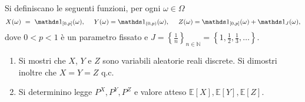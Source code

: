 Si definiscano le seguenti funzioni, per ogni $\omega \in \Omega $
\begin{equation*}
X( \omega ) \ =\ \Ind_{[ 0,p]}( \omega ) ,\ \ \ \ Y( \omega ) =\Ind_{( 0,p)}( \omega ) ,\ \ \ \ Z( \omega ) =\Ind_{[ 0,p]}( \omega ) +\Ind_{J}( \omega ) ,
\end{equation*}
dove $0< p< 1$ è un parametro fissato e $J=\left\{\frac{1}{n}\right\}_{n\in \mathbb{N}} =\left\{1,\frac{1}{2} ,\frac{1}{3} ,\dotsc \right\}$.
\begin{enumerate}
\item Si mostri che $X$, $Y$ e $Z$ sono variabili aleatorie reali discrete. Si dimostri inoltre che $X=Y=Z$ q.c.
\item Si determinino legge $P^{X} ,P^{Y} ,P^{Z}$ e valore atteso $\mathbb{E}[ X] ,\mathbb{E}[ Y] ,\mathbb{E}[ Z]$.
\end{enumerate}
\Esercizio{}


